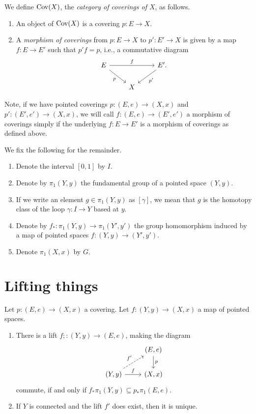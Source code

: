 \begin{definition}
  We define $\operatorname{Cov}(X)$, the \emph{category of coverings of $X$}, as
  follows.
  \begin{enumerate}
  \item An object of $\operatorname{Cov}(X)$ is a covering $p : E \to X$.
  \item A \emph{morphism of coverings} from $p : E \to X$ to $p' : E'
    \to X$ is given by a map $f : E \to E'$ such that $p'f = p$, i.e.,
    a commutative diagram
    \[
    \begin{tikzcd}
      E \ar{rr}{f} \drar[swap]{p} & & E'. \dlar{p'} \\ & X &
    \end{tikzcd}
    \]
  \end{enumerate}
  Note, if we have pointed coverings $p : (E,e) \to (X,x)$ and $p' :
  (E',e') \to (X,x)$, we will call $f : (E,e) \to (E',e')$ a morphism
  of coverings simply if the underlying $f : E \to E'$ is a morphism
  of coverings as defined above.
\end{definition}

\begin{notation}
  We fix the following for the remainder.
  \begin{enumerate}
  \item Denote the interval $[0,1]$ by $I$.
  \item Denote by $\pi_1(Y,y)$ the fundamental group of a pointed
    space $(Y,y)$.
  \item If we write an element $g \in \pi_1(Y,y)$ as $[\gamma]$, we
    mean that $g$ is the homotopy class of the loop $\gamma : I \to Y$
    based at $y$.
  \item Denote by $f_* : \pi_1(Y,y) \to \pi_1(Y',y')$ the group
    homomorphism induced by a map of pointed spaces $f : (Y,y) \to
    (Y',y')$.
  \item Denote $\pi_1(X,x)$ by $G$.
  \end{enumerate}
\end{notation}


\section{Lifting things}

\begin{proposition}
  \label{general-lifting}
  Let $p : (E,e) \to (X,x)$ a covering. Let $f : (Y,y) \to (X,x)$ a
  map of pointed spaces.
  \begin{enumerate}
  \item There is a lift $f; : (Y,y) \to (E,e)$,
    making the diagram
    \[
    \begin{tikzcd}
      \ & (E,e) \dar{p} \\ (Y,y) \rar{f} \ar[dashed]{ur}{f'} & (X,x)
    \end{tikzcd}
    \]
    commute, if and only if $f_*\pi_1(Y,y) \subseteq p_*\pi_1(E,e)$.
  \item If $Y$ is connected and the lift $f'$ does exist, then it is
    unique.
  \end{enumerate}
\end{proposition}


